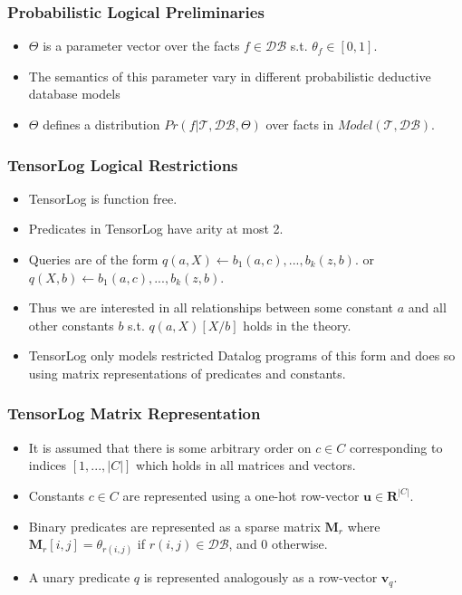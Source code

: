 \documentclass{beamer}
\begin{document}
\begin{frame}
\frametitle{Probabilistic Logical Preliminaries}
\begin{itemize}
	\item $\Theta$ is a parameter vector over the facts $f \in \mathcal{DB}$ s.t. $\theta_f \in [0,1]$.
	\item The semantics of this parameter
	vary in different probabilistic deductive database models
	\item $\Theta$ defines a distribution $Pr(f | \mathcal{T}, \mathcal{DB}, \Theta)$ over facts in $Model(\mathcal{T}, \mathcal{DB})$.
\end{itemize}
\end{frame}

\begin{frame}
\frametitle{TensorLog Logical Restrictions}
\begin{itemize}
	\item TensorLog is function free.
	\item Predicates in TensorLog have arity at most 2.
	\item Queries are of the form $q(a, X) \leftarrow b_1(a, c), ..., b_k(z, b).$ or $q(X, b) \leftarrow b_1(a, c), ..., b_k(z, b).$
	\item Thus we are interested in all relationships between some constant $a$ and all other constants $b$ s.t. $q(a, X)[X/b]$ holds in the theory.
	\item TensorLog only models restricted Datalog programs of this form and does so using matrix representations of predicates and constants.
\end{itemize}
\end{frame}

\begin{frame}
\frametitle{TensorLog Matrix Representation}
\begin{itemize}
	\item It is assumed that there is some arbitrary order on $c \in C$ corresponding to indices $[1, ..., |C|]$ which holds in all matrices and vectors.
	\item Constants $c \in C$ are represented using a one-hot row-vector $\textbf{u} \in \mathbf{R}^{|C|}$.
	\item Binary predicates are represented as a sparse matrix $\textbf{M}_r$ where $\textbf{M}_r[i, j] = \theta_{r(i, j)}$ if $r(i, j) \in \mathcal{DB}$, and 0 otherwise.
	\item  A unary predicate $q$ is represented analogously as a row-vector $\textbf{v}_q$.
\end{itemize}
\end{frame}
\end{document}
